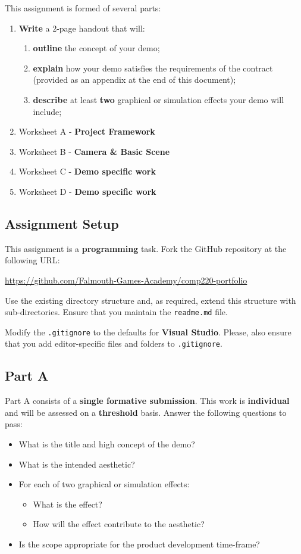 \documentclass{../../fal_assignment}
\begin{document}
This assignment is formed of several parts:
\begin{enumerate}[label=(\Alph*)]
	\item \textbf{Write} a 2-page handout that will:
		\begin{enumerate}[label=(\roman*)]
			\item \textbf{outline} the concept of your demo;
			\item \textbf{explain} how your demo satisfies the requirements of the contract (provided as an appendix at the end of this document);
			\item \textbf{describe} at least \textbf{two} graphical or simulation effects your demo will include;
		\end{enumerate}
	\item Worksheet A - \textbf{Project Framework}
	\item Worksheet B - \textbf{Camera \& Basic Scene}
	\item Worksheet C - \textbf{Demo specific work}
	\item Worksheet D - \textbf{Demo specific work}
\end{enumerate}

\subsection*{Assignment Setup}

This assignment is a \textbf{programming} task. Fork the GitHub repository at the following URL:

\indent \url{https://github.com/Falmouth-Games-Academy/comp220-portfolio}

Use the existing directory structure and, as required, extend this structure with sub-directories.
Ensure that you maintain the \texttt{readme.md} file.

Modify the \texttt{.gitignore} to the defaults for \textbf{Visual Studio}.
Please, also ensure that you add editor-specific files and folders to \texttt{.gitignore}. 

\subsection*{Part A}

Part A consists of a \textbf{single formative submission}. This work is \textbf{individual} and will be assessed on a \textbf{threshold} basis. Answer the following questions to pass:

\begin{itemize}
	\item What is the title and high concept of the demo?
	\item What is the intended aesthetic?
	\item For each of two graphical or simulation effects:
	\begin{itemize}
		\item What is the effect?
		\item How will the effect contribute to the aesthetic?
	\end{itemize}
	\item Is the scope appropriate for the product development time-frame?
\end{itemize}
\end{document}
